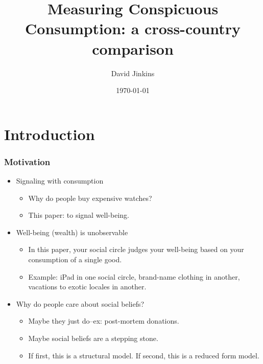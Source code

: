 \documentclass{beamer}
\title{Measuring Conspicuous Consumption: a cross-country comparison}
\author{David Jinkins}
\institute
{
Pennsylvania State University\\
\medskip
{\emph{david.jinkins@gmail.com}}
}
\date{\today}
\begin{document}
%
\begin{frame}
\titlepage
\end{frame}
%
\section{Introduction}

\begin{frame}
  \frametitle{Motivation}
  	\begin{itemize}
           \item Signaling with consumption
	     \begin{itemize}
	       \item Why do people buy expensive watches? 
	       \item This paper: to signal well-being.
	     \end{itemize}
	   \item Well-being (wealth) is unobservable
	     \begin{itemize}
		\item In this paper, your social circle judges your well-being based on your consumption of a single good.
		\item Example: iPad in one social circle, brand-name clothing in another, vacations to exotic locales in another.
	     \end{itemize}
	   \item Why do people care about social beliefs?
	     \begin{itemize}
	       \item Maybe they just do--ex: post-mortem donations.
	       \item Maybe social beliefs are a stepping stone.
	       \item If first, this is a structural model.  If second, this is a reduced form model.
	     \end{itemize}
	\end{itemize}
\end{frame}
%
\end{document}
